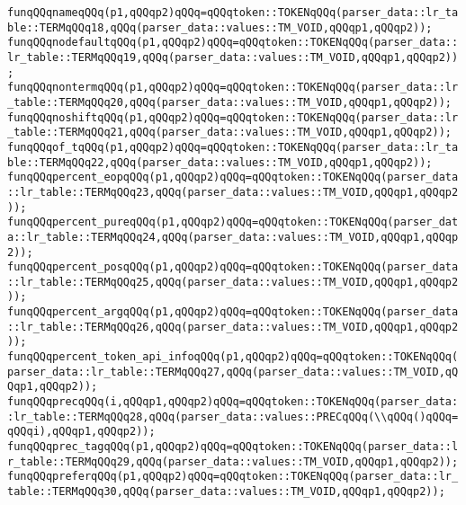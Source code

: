 \verb|funqQQqnameqQQq(p1,qQQqp2)qQQq=qQQqtoken::TOKENqQQq(parser_data::lr_table::TERMqQQq18,qQQq(parser_data::values::TM_VOID,qQQqp1,qQQqp2));|\newline
\verb|funqQQqnodefaultqQQq(p1,qQQqp2)qQQq=qQQqtoken::TOKENqQQq(parser_data::lr_table::TERMqQQq19,qQQq(parser_data::values::TM_VOID,qQQqp1,qQQqp2));|\newline
\verb|funqQQqnontermqQQq(p1,qQQqp2)qQQq=qQQqtoken::TOKENqQQq(parser_data::lr_table::TERMqQQq20,qQQq(parser_data::values::TM_VOID,qQQqp1,qQQqp2));|\newline
\verb|funqQQqnoshiftqQQq(p1,qQQqp2)qQQq=qQQqtoken::TOKENqQQq(parser_data::lr_table::TERMqQQq21,qQQq(parser_data::values::TM_VOID,qQQqp1,qQQqp2));|\newline
\verb|funqQQqof_tqQQq(p1,qQQqp2)qQQq=qQQqtoken::TOKENqQQq(parser_data::lr_table::TERMqQQq22,qQQq(parser_data::values::TM_VOID,qQQqp1,qQQqp2));|\newline
\verb|funqQQqpercent_eopqQQq(p1,qQQqp2)qQQq=qQQqtoken::TOKENqQQq(parser_data::lr_table::TERMqQQq23,qQQq(parser_data::values::TM_VOID,qQQqp1,qQQqp2));|\newline
\verb|funqQQqpercent_pureqQQq(p1,qQQqp2)qQQq=qQQqtoken::TOKENqQQq(parser_data::lr_table::TERMqQQq24,qQQq(parser_data::values::TM_VOID,qQQqp1,qQQqp2));|\newline
\verb|funqQQqpercent_posqQQq(p1,qQQqp2)qQQq=qQQqtoken::TOKENqQQq(parser_data::lr_table::TERMqQQq25,qQQq(parser_data::values::TM_VOID,qQQqp1,qQQqp2));|\newline
\verb|funqQQqpercent_argqQQq(p1,qQQqp2)qQQq=qQQqtoken::TOKENqQQq(parser_data::lr_table::TERMqQQq26,qQQq(parser_data::values::TM_VOID,qQQqp1,qQQqp2));|\newline
\verb|funqQQqpercent_token_api_infoqQQq(p1,qQQqp2)qQQq=qQQqtoken::TOKENqQQq(parser_data::lr_table::TERMqQQq27,qQQq(parser_data::values::TM_VOID,qQQqp1,qQQqp2));|\newline
\verb|funqQQqprecqQQq(i,qQQqp1,qQQqp2)qQQq=qQQqtoken::TOKENqQQq(parser_data::lr_table::TERMqQQq28,qQQq(parser_data::values::PRECqQQq(\\qQQq()qQQq=qQQqi),qQQqp1,qQQqp2));|\newline
\verb|funqQQqprec_tagqQQq(p1,qQQqp2)qQQq=qQQqtoken::TOKENqQQq(parser_data::lr_table::TERMqQQq29,qQQq(parser_data::values::TM_VOID,qQQqp1,qQQqp2));|\newline
\verb|funqQQqpreferqQQq(p1,qQQqp2)qQQq=qQQqtoken::TOKENqQQq(parser_data::lr_table::TERMqQQq30,qQQq(parser_data::values::TM_VOID,qQQqp1,qQQqp2));|\newline
